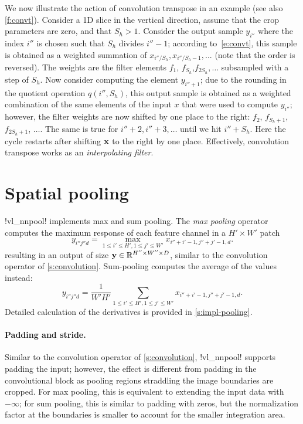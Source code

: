 We now illustrate the action of convolution transpose in an example (see also \cref{f:convt}).  Consider a 1D slice in the vertical direction, assume that the crop parameters are zero, and that $S_h>1$. Consider the output sample $y_{i''}$ where the index $i''$ is chosen such that $S_h$ divides $i''-1$; according to~\eqref{e:convt}, this sample is obtained as a weighted summation of $x_{i'' / S_h},x_{i''/S_h-1},...$ (note that the order is reversed). The weights are the filter elements $f_1$, $f_{S_h}$,$f_{2S_h},\dots$ subsampled with a step of $S_h$. Now consider computing the element $y_{i''+1}$; due to the rounding in the quotient operation $q(i'',S_h)$, this output sample is obtained as a weighted combination of the same elements of the input $x$ that were used to compute $y_{i''}$; however, the filter weights are now shifted by one place to the right: $f_2$, $f_{S_h+1}$,$f_{2S_h+1}$, $\dots$. The same is true for $i''+2, i'' + 3,\dots$ until we hit $i'' + S_h$. Here the cycle restarts after shifting $\mathbf{x}$ to the right by one place. Effectively, convolution transpose works as an \emph{interpolating filter}.

\section{Spatial pooling}\label{s:pooling}

!vl_nnpool! implements max and sum pooling. The \emph{max pooling} operator computes the maximum response of each feature channel in a $H' \times W'$ patch
\[
y_{i''j''d} = \max_{1\leq i' \leq H', 1 \leq j' \leq W'} x_{i''+i'-1,j''+j'-1,d}.
\]
resulting in an output of size $\mathbf{y}\in\mathbb{R}^{H''\times W'' \times D}$, similar to the convolution operator of \cref{s:convolution}. Sum-pooling computes the average of the values instead:
\[
y_{i''j''d} = \frac{1}{W'H'}
\sum_{1\leq i' \leq H', 1 \leq j' \leq W'} x_{i''+i'-1,j''+j'-1,d}.
\]
Detailed calculation of the derivatives is provided in \cref{s:impl-pooling}.

\paragraph{Padding and stride.} Similar to the convolution operator of \cref{s:convolution}, !vl_nnpool! supports padding the input; however, the effect is different from padding in the convolutional block as pooling regions straddling the image boundaries are cropped. For max pooling, this is equivalent to extending the input data with $-\infty$; for sum pooling, this is similar to padding with zeros, but the normalization factor at the boundaries is smaller to account for the smaller integration area.

